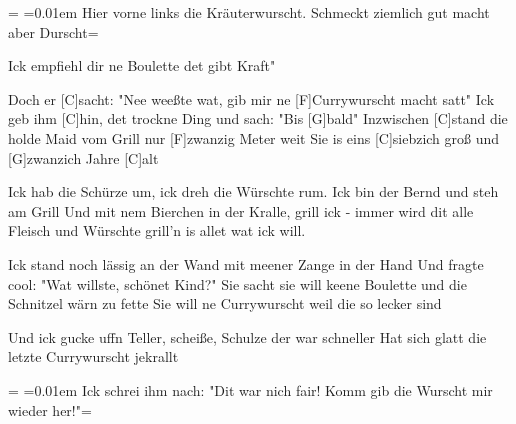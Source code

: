 \newdimen\origiwstr%
\origiwstr=\font%
\font=0.01em Hier vorne links die Kräuterwurscht. Schmeckt ziemlich gut macht aber Durscht\font=\origiwstr

\begin{guitar}
	Ick empfiehl dir ne Boulette det gibt Kraft"
	
	Doch er [C]sacht: "Nee weeßte wat, gib mir ne [F]Currywurscht macht satt"
	Ick geb ihm [C]hin, det trockne Ding und sach: "Bis [G]bald"
	Inzwischen [C]stand die holde Maid vom Grill nur [F]zwanzig Meter weit
	Sie is eins [C]siebzich groß und [G]zwanzich Jahre [C]alt
	
	\begin{highlightbar}
		Ick hab die Schürze um, ick dreh die Würschte rum.
		Ick bin der Bernd und steh am Grill
		Und mit nem Bierchen in der Kralle, grill ick - immer wird dit alle
		Fleisch und Würschte grill'n is allet wat ick will.
	\end{highlightbar}
	
	Ick stand noch lässig an der Wand mit meener Zange in der Hand
	Und fragte cool: "Wat willste, schönet Kind?"
	Sie sacht sie will keene Boulette und die Schnitzel wärn zu fette
	Sie will ne Currywurscht weil die so lecker sind
	
	Und ick gucke uffn Teller, scheiße, Schulze der war schneller
	Hat sich glatt die letzte Currywurscht jekrallt\hfill%
\end{guitar}

\newdimen\origiwstr%
\origiwstr=\font%
\font=0.01em Ick schrei ihm nach: "Dit war nich fair! Komm gib die Wurscht mir wieder her!"\font=\origiwstr

